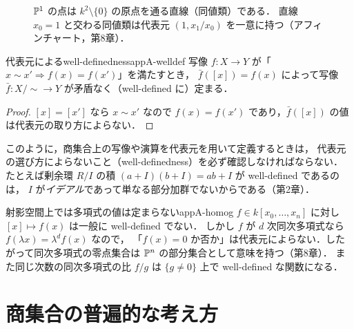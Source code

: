 \begin{figure}[H]
\centering
{}
\caption{$\mathbb{P}^1$ の点は $k^2\setminus\{0\}$ の原点を通る直線（同値類）である．
直線 $x_0=1$ と交わる同値類は代表元 $(1,x_1/x_0)$ を一意に持つ（アフィンチャート，第8章）．}
\end{figure}

\begin{myprop}{代表元によるwell-definedness}{appA-welldef}
写像 $f\colon X\to Y$ が「$x\sim x'\Rightarrow f(x)=f(x')$」を満たすとき，
$\bar f([x])=f(x)$ によって写像 $\bar f\colon X/{\sim}\to Y$ が矛盾なく（well-defined に）定まる．
\end{myprop}
\begin{proof}
$[x]=[x']$ なら $x\sim x'$ なので $f(x)=f(x')$ であり，$\bar f([x])$ の値は代表元の取り方によらない．
\end{proof}

このように，商集合上の写像や演算を代表元を用いて定義するときは，
代表元の選び方によらないこと（well-definedness）を必ず確認しなければならない．
たとえば剰余環 $R/I$ の積 $(a+I)(b+I)=ab+I$ が well-defined であるのは，
$I$ が\emph{イデアル}であって単なる部分加群でないからである（第2章）．

\begin{myex}{射影空間上では多項式の値は定まらない}{appA-homog}
$f\in k[x_0,\dots,x_n]$ に対し $[x]\mapsto f(x)$ は一般に well-defined でない．
しかし $f$ が $d$ 次同次多項式なら $f(\lambda x)=\lambda^d f(x)$ なので，
「$f(x)=0$ か否か」は代表元によらない．したがって同次多項式の零点集合は $\mathbb{P}^n$ の部分集合として意味を持つ（第8章）．
また同じ次数の同次多項式の比 $f/g$ は $\{g\ne0\}$ 上で well-defined な関数になる．
\end{myex}

\section{商集合の普遍的な考え方}

